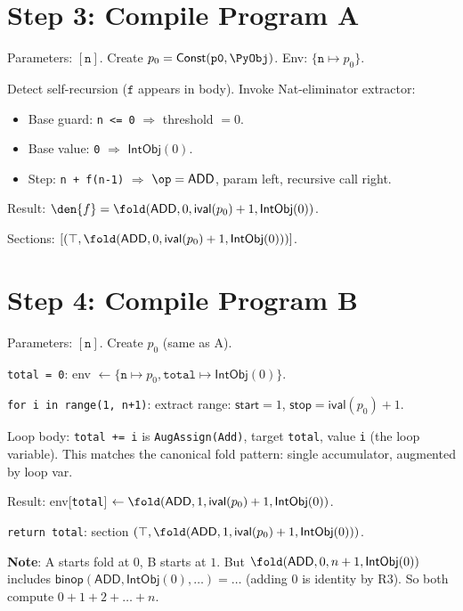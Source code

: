 \section{Step 3: Compile Program A}

Parameters: $[\texttt{n}]$.  Create $p_0 = \mathsf{Const}(\texttt{p0},
\PyObj)$.  Env: $\{\texttt{n} \mapsto p_0\}$.

Detect self-recursion ($\texttt{f}$ appears in body).  Invoke
Nat-eliminator extractor:
\begin{itemize}
  \item Base guard: \texttt{n <= 0} $\Rightarrow$ threshold $= 0$.
  \item Base value: \texttt{0} $\Rightarrow$ $\mathsf{IntObj}(0)$.
  \item Step: \texttt{n + f(n-1)} $\Rightarrow$ $\op = \mathsf{ADD}$,
    param left, recursive call right.
\end{itemize}

Result: $\den{f} = \fold(\mathsf{ADD}, 0, \mathsf{ival}(p_0) + 1,
\mathsf{IntObj}(0))$.

Sections: $[(\top, \fold(\mathsf{ADD}, 0, \mathsf{ival}(p_0)+1,
\mathsf{IntObj}(0)))]$.

\section{Step 4: Compile Program B}

Parameters: $[\texttt{n}]$.  Create $p_0$ (same as A).

\texttt{total = 0}: env $\leftarrow \{\texttt{n} \mapsto p_0,
\texttt{total} \mapsto \mathsf{IntObj}(0)\}$.

\texttt{for i in range(1, n+1)}: extract range: $\mathsf{start} = 1$,
$\mathsf{stop} = \mathsf{ival}(p_0) + 1$.

Loop body: \texttt{total += i} is \texttt{AugAssign(Add)}, target
\texttt{total}, value \texttt{i} (the loop variable).  This matches
the canonical fold pattern: single accumulator, augmented by loop var.

Result: env[\texttt{total}] $\leftarrow \fold(\mathsf{ADD}, 1,
\mathsf{ival}(p_0)+1, \mathsf{IntObj}(0))$.

\texttt{return total}: section $(\top, \fold(\mathsf{ADD}, 1,
\mathsf{ival}(p_0)+1, \mathsf{IntObj}(0)))$.

\textbf{Note}: A starts fold at $0$, B starts at $1$.  But
$\fold(\mathsf{ADD}, 0, n+1, \mathsf{IntObj}(0))$ includes
$\mathsf{binop}(\mathsf{ADD}, \mathsf{IntObj}(0), \ldots) =
\ldots$ (adding 0 is identity by R3).  So both compute
$0 + 1 + 2 + \ldots + n$.

